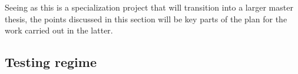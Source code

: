 \begin{comment}
What are the main contributions made to the field?
How significant are these contributions?
Also discuss the contributions in terms of the goals and research questions formulated in the Introduction.

The contributions section will normally contain everything that you address in the abstract, but in an extended form and quite possibly additional issues that cannot be included in the abstract.
An obvious difference is that when the reader has come this far in the text, she/he should be quite familiar with the work, but while reading the abstract they will have little to no knowledge of the work.

The section ``Contributions'' in Chapter~\ref{cha:introduction} differs from this one in that the former is just a list of the main bits, while this section should explain them in more detail.
However, basically the same items should appear in both sections.

\section{Future Work}
\label{sec:futureWork}

Consider where you would like to extend or improve this work, or how somebody else could continue it.
These extensions might either be continuing the ongoing direction or taking a side direction that became obvious during the work.
Further, possible solutions to limitations in the work conducted, highlighted in Section~\ref{sec:discussion} may be presented.

Note that in the Specialisation Project Report, the Future Work section will be a key part of your plan for the novel work to be carried out in the next semester,
while in the Master's Thesis, the Future Work section rather will point to issues that others might be interested in addressing.
This can include options and alternatives that you did not try out yourself, or potential improvements and extensions to your experiments or system.
\end{comment}

Seeing as this is a specialization project that will transition into a larger master thesis, the points discussed in this section will be key parts of the plan for the work carried out in the latter.

\subsection{Testing regime}

